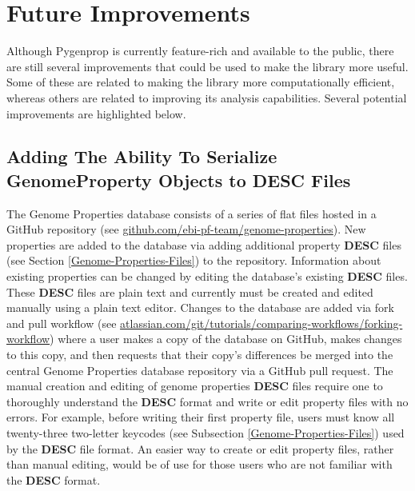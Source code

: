 \section{Future Improvements}

Although Pygenprop is currently feature-rich and available to the public, there 
are still several improvements that could be used to make the library more 
useful. Some of these are related to making the library more computationally 
efficient, whereas others are related to improving its analysis capabilities. 
Several potential improvements are highlighted below.

\subsection{Adding The Ability To Serialize GenomeProperty Objects to DESC 
Files}

The Genome Properties database consists of a series of flat files hosted in a 
GitHub repository (see 
\href{http://github.com/ebi-pf-team/genome-properties}{github.com/ebi-pf-team/genome-properties}). 
New properties are added to the database via adding additional property 
\textbf{DESC} files (see Section \ref{Genome-Properties-Files}) to the 
repository. Information about existing properties can be changed by editing the 
database's existing \textbf{DESC} files. These \textbf{DESC} files are plain 
text and currently must be created and edited manually using a plain text 
editor. Changes to the database are added via fork and pull workflow (see 
\href{https://www.atlassian.com/git/tutorials/comparing-workflows/forking-workflow}{atlassian.com/git/tutorials/comparing-workflows/forking-workflow}) 
where a user makes a copy of the database on GitHub, makes changes to this copy, 
and then requests that their copy's differences be merged into the central 
Genome Properties database repository via a GitHub pull request. The manual 
creation and editing of genome properties \textbf{DESC} files require one to 
thoroughly understand the \textbf{DESC} format and write or edit property files 
with no errors. For example, before writing their first property file, users 
must know all twenty-three two-letter keycodes (see Subsection 
\ref{Genome-Properties-Files}) used by the \textbf{DESC} file format. An easier 
way to create or edit property files, rather than manual editing, would be of 
use for those users who are not familiar with the \textbf{DESC} format.

